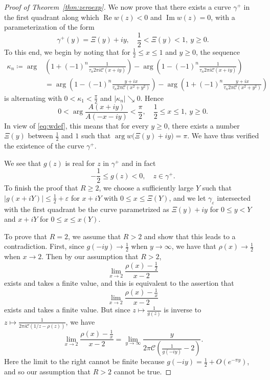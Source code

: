 \documentclass[12pt]{amsart}
\theoremstyle{plain}
\numberwithin{equation}{section}
\theoremstyle{definition}
\newcommand{\Cone}{\mathscr{C}}
\begin{document}
\begin{proof}[Proof of Theorem~\ref{thm:zeroexp}]
We now prove that there exists a curve $\gamma^+$ in the first quadrant along which $\operatorname{Re} w(z) <0$ and $\operatorname{Im} w(z) =0$, with a parameterization of the form
\[ \gamma^+(y)=\Xi(y)+iy, \quad  \frac12 < \Xi(y) < 1, \ y\ge 0.\]
To this end, we begin by noting that for $\frac12 \le x \le 1$ and $y\ge 0$, the sequence
\begin{align*} \kappa_n\coloneqq  \arg & \left(1+(-1)^n\frac{1}{\tau_n 2\pi i \Cone(x+iy)}\right) -  \arg \left(1-(-1)^n\frac{1}{\tau_n 2\pi i \Cone(x+iy)}\right) \\
& =  \arg  \left(1-(-1)^n\frac{y+ix}{\tau_n 2\pi  \Cone(x^2+y^2)}\right) -  \arg \left(1+(-1)^n\frac{y+ix}{\tau_n 2\pi \Cone(x^2+y^2)}\right) \end{align*}
is alternating with $0<\kappa_1<\frac{\pi}{2}$ and $|\kappa_n|\searrow 0$. Hence
\[ 0<\arg \frac{A(x+iy)}{A(-x-iy)}<\frac{\pi}{2}, \quad \frac12  \le x \le 1, \ y\ge 0. \]
In view of  \eqref{eq:wdef}, this means that for every $y\ge 0$, there exists a number $\Xi(y)$ between $\frac12$ and $1$ such that $\arg w\big(\Xi(y)+iy\big)=\pi$. We have thus verified the existence of the curve $\gamma^+$.

 We see that $g(z)$ is real for $z$ in $\gamma^+$ and in fact
\begin{equation} \label{eq:negative} - \frac{1}{2} \le g(z) < 0, \quad z\in \gamma^+. \end{equation}
To finish the proof that $R\ge 2$, we choose a sufficiently large $Y$ such that $|g(x+iY)|\le \frac12+\varepsilon$ for $x+iY$ with $0 \le x \le \Xi(Y)$, and we let $\gamma_{\varepsilon}$ intersected with the first quadrant be the curve parametrized as $\Xi(y)+iy$ for $0\le y < Y$ and $x+iY$ for $0\le x \le x(Y)$.

To prove that $R=2$, we assume that $R>2$ and show that this leads to a contradiction. First, since $g(-iy)\to \frac12$ when $y\to \infty$, we have that $\rho(x)\to \frac12$ when $x\to 2$. Then by our assumption that $R>2$,
\[ \lim_{x\to 2} \frac{\rho(x)-\frac12}{x-2} \]
exists and takes a finite value, and this is equivalent to the assertion that
\[ \lim_{x\to 2} \frac{\rho(x)-\frac1x}{x-2} \]
exists and takes a finite value. But since $z\mapsto\frac{1}{g(z)}$ is inverse to $z\mapsto \frac{1}{2\pi i \Cone (1/z-\rho(z))}$, we have
\[  \lim_{x\to 2} \frac{\rho(x)-\frac1x}{x-2} = \lim_{y\to \infty} \frac{y}{2\pi  \Cone (\frac{1}{g(-iy)}-2)}. \]
Here the limit to the right cannot be finite because $g(-iy)=\frac12+O(e^{-\pi y})$, and so our assumption that $R>2$ cannot be true.


\end{proof}
\end{document}
